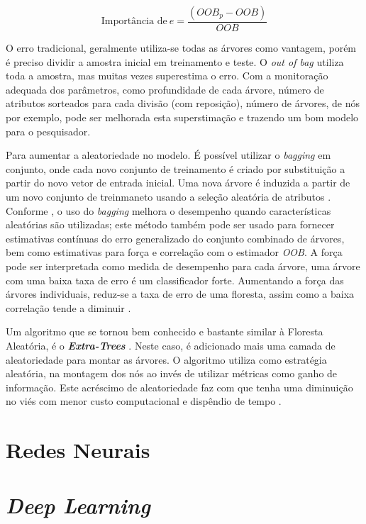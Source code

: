 \documentclass[
  openany]{book}
\begin{document}
\begin{equation}
\mbox{Importância de} \ e = \frac{(OOB_p-OOB)}{OOB}
\label{eq:impc}
\end{equation}

O erro tradicional, geralmente utiliza-se todas as árvores como vantagem, porém é preciso dividir a amostra inicial em treinamento e teste. O \emph{out of bag} utiliza toda a amostra, mas muitas vezes superestima o erro. Com a monitoração adequada dos parâmetros, como profundidade de cada árvore, número de atributos sorteados para cada divisão (com reposição), número de árvores, de nós por exemplo, pode ser melhorada esta superstimação e trazendo um bom modelo para o pesquisador.

Para aumentar a aleatoriedade no modelo. É possível utilizar o \emph{bagging} em conjunto, onde cada novo conjunto de treinamento é criado por substituição a partir do novo vetor de entrada inicial. Uma nova árvore é induzida a partir de um novo conjunto de treinmaneto usando a seleção aleatória de atributos \citep{gomez2012random}. Conforme \citep{breiman2001random}, o uso do \emph{bagging} melhora o desempenho quando características aleatórias são utilizadas; este método também pode ser usado para fornecer estimativas contínuas do erro generalizado do conjunto combinado de árvores, bem como estimativas para força e correlação com o estimador \emph{OOB}. A força pode ser interpretada como medida de desempenho para cada árvore, uma árvore com uma baixa taxa de erro é um classificador forte. Aumentando a força das árvores individuais, reduz-se a taxa de erro de uma floresta, assim como a baixa correlação tende a diminuir \citep{oshiro2013abordagem}.

Um algoritmo que se tornou bem conhecido e bastante similar à Floresta Aleatória, é o \textbf{\emph{Extra-Trees}} \citep{geurts2006extremely}. Neste caso, é adicionado mais uma camada de aleatoriedade para montar as árvores. O algoritmo utiliza como estratégia aleatória, na montagem dos nós ao invés de utilizar métricas como ganho de informação. Este acréscimo de aleatoriedade faz com que tenha uma diminuição no viés com menor custo computacional e dispêndio de tempo \citep{machado2020avaliaccao}.

\hypertarget{redesneurais}{%
\chapter{Redes Neurais}\label{redesneurais}}

\hypertarget{deeplearning}{%
\chapter{\texorpdfstring{\emph{Deep Learning}}{Deep Learning}}\label{deeplearning}}

  
\end{document}
